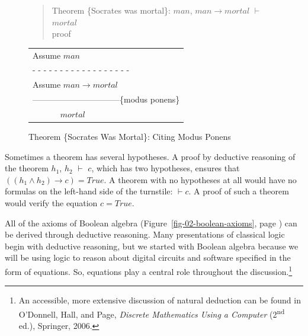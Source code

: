 \begin{figure}
\begin{quote}
Theorem \{Socrates was mortal\}: $man$, $man \rightarrow mortal$ $\vdash$ $mortal$ \\
proof
\end{quote}
\begin{center}
\begin{tabular}{l}
Assume $man$                    \\
 - - - - - - - - - - - - - - - - - -\\
Assume $man \rightarrow mortal$ \\
--------------------------------\{modus ponens\} \\
~~~~~~ $mortal$                 \\
\end{tabular}
\end{center}
\caption{Theorem \{Socrates Was Mortal\}: Citing Modus Ponens}
\label{fig:socrates-proof}
\end{figure}

Sometimes a theorem has several hypotheses.
A proof by deductive reasoning of the theorem
$h_1$, $h_2$ $\vdash$ $c$,
which has two hypotheses,
ensures that
$((h_1 \wedge h_2) \rightarrow c) = True$.
A theorem with no hypotheses at all
would have no formulas on the left-hand side of the turnstile:
$\vdash c$.
A proof of such a theorem would
verify the equation $c = True$.

All of the axioms of Boolean algebra
(Figure~\ref{fig-02-boolean-axioms}, page \pageref{fig-02-boolean-axioms})
can be derived through deductive reasoning.
Many presentations of classical logic begin with
deductive reasoning,
but we started with Boolean algebra
because we will be using logic to reason about
digital circuits and software specified in the form of equations.
So, equations play a central role throughout the
discussion.\footnote{An accessible,
more extensive discussion of natural deduction can be found
in O'Donnell, Hall, and Page,
\emph{Discrete Mathematics Using a Computer}
(2\textsuperscript{nd} ed.), Springer, 2006.}

